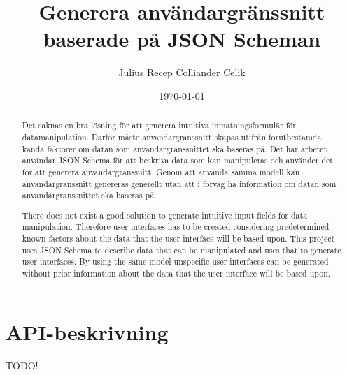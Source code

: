 \documentclass[swedish]{kththesis}
\begin{document}
\title{Generera användargränssnitt baserade på JSON Scheman}
\author{Julius Recep Colliander Celik}
\date{\today}

\frontmatter

\titlepage

\begin{abstract}
Det saknas en bra lösning för att generera intuitiva inmatningsformulär för datamanipulation. Därför måste användargränssnitt skapas utifrån förutbestämda kända faktorer om datan som användargränssnittet ska baseras på. Det här arbetet användar JSON Schema för att beskriva data som kan manipuleras och använder det för att generera användargränssnitt. Genom att använda samma modell kan användargränssnitt genereras generellt utan att i förväg ha information om datan som användargränssnittet ska baseras på.
\end{abstract}


\begin{otherlanguage}{english}
	\begin{abstract}
There does not exist a good solution to generate intuitive input fields for data manipulation. Therefore user interfaces has to be created considering predetermined known factors about the data that the user interface will be based upon. This project uses JSON Schema to describe data that can be manipulated and uses that to generate user interfaces. By using the same model unspecific user interfaces can be generated without prior information about the data that the user interface will be based upon.
	\end{abstract}
\end{otherlanguage}


\tableofcontents

\mainmatter







\printbibliography[heading=bibintoc] %

\appendix

\chapter{API-beskrivning}
\label{appendix:api-beskrivning}
TODO!
\end{document}
